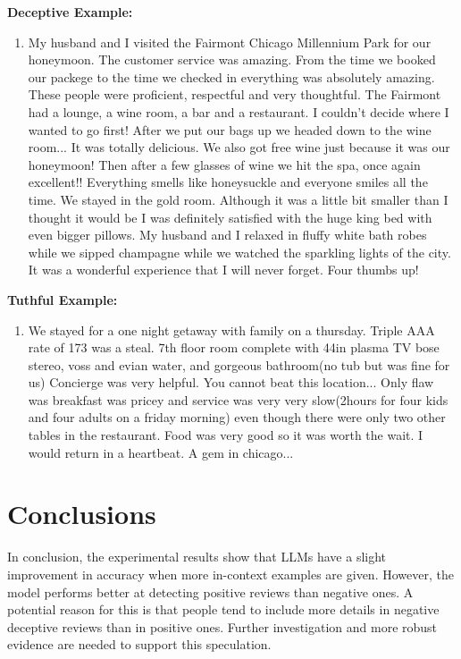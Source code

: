 \documentclass[sigconf, nonacm]{acmart}
\newenvironment{example}
{\begin{mdframed}[
    linecolor=exampleborder,
    linewidth=0.5pt,
    backgroundcolor=examplecolor,
    topline=false,
    bottomline=false,
    leftline=true,
    rightline=false,
    innertopmargin=2pt,
    innerbottommargin=2pt,
    innerleftmargin=5pt,
    innerrightmargin=5pt,
    skipabove=10pt,
    skipbelow=10pt
]}
{\end{mdframed}}
\theoremstyle{definition}
\begin{document}
\begin{example}
  \textbf{Deceptive Example:}
  \begin{enumerate}
    \item My husband and I visited the Fairmont Chicago Millennium Park for our honeymoon. The customer service was amazing. From the time we booked our packege to the time we checked in everything was absolutely amazing. These people were proficient, respectful and very thoughtful. The Fairmont had a lounge, a wine room, a bar and a restaurant. I couldn't decide where I wanted to go first! After we put our bags up we headed down to the wine room... It was totally delicious. We also got free wine just because it was our honeymoon! Then after a few glasses of wine we hit the spa, once again excellent!! Everything smells like honeysuckle and everyone smiles all the time. We stayed in the gold room. Although it was a little bit smaller than I thought it would be I was definitely satisfied with the huge king bed with even bigger pillows. My husband and I relaxed in fluffy white bath robes while we sipped champagne while we watched the sparkling lights of the city. It was a wonderful experience that I will never forget. Four thumbs up!
  \end{enumerate}
\end{example}

\begin{example}
  \textbf{Tuthful Example:}
  \begin{enumerate}
    \item We stayed for a one night getaway with family on a thursday. Triple AAA rate of 173 was a steal. 7th floor room complete with 44in plasma TV bose stereo, voss and evian water, and gorgeous bathroom(no tub but was fine for us) Concierge was very helpful. You cannot beat this location... Only flaw was breakfast was pricey and service was very very slow(2hours for four kids and four adults on a friday morning) even though there were only two other tables in the restaurant. Food was very good so it was worth the wait. I would return in a heartbeat. A gem in chicago...
  \end{enumerate}
\end{example}

\section{Conclusions}

In conclusion, the experimental results show that LLMs have a slight improvement in accuracy when more in-context examples are given. However, the model performs better at detecting positive reviews than negative ones. A potential reason for this is that people tend to include more details in negative deceptive reviews than in positive ones. Further investigation and more robust evidence are needed to support this speculation.
\end{document}
